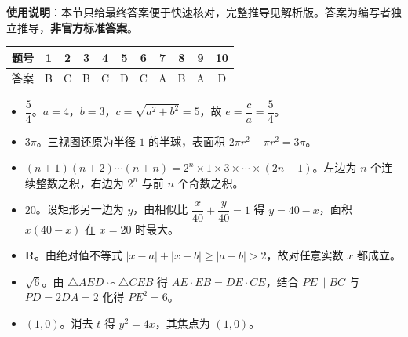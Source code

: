 
\begin{gknotice}
\textbf{使用说明}：本节只给最终答案便于快速核对，完整推导见解析版。答案为编写者独立推导，\textbf{非官方标准答案}。
\end{gknotice}

\begin{center}\begin{tabular}{ccccccccccc}
\toprule
题号 & 1 & 2 & 3 & 4 & 5 & 6 & 7 & 8 & 9 & 10 \\
\midrule
答案 & B & C & B & C & D & C & A & B & A & D \\
\bottomrule
\end{tabular}\end{center}

\begin{itemize}[leftmargin=2.6em]
  \item[\textbf{11.}] $\dfrac54$。$a=4$，$b=3$，$c=\sqrt{a^2+b^2}=5$，故 $e=\dfrac ca=\dfrac54$。
  \item[\textbf{12.}] $3\pi$。三视图还原为半径 $1$ 的半球，表面积 $2\pi r^2+\pi r^2=3\pi$。
  \item[\textbf{13.}] $(n+1)(n+2)\cdots(n+n)=2^n\times1\times3\times\cdots\times(2n-1)$。左边为 $n$ 个连续整数之积，右边为 $2^n$ 与前 $n$ 个奇数之积。
  \item[\textbf{14.}] $20$。设矩形另一边为 $y$，由相似比 $\dfrac{x}{40}+\dfrac{y}{40}=1$ 得 $y=40-x$，面积 $x(40-x)$ 在 $x=20$ 时最大。
  \item[\textbf{15.}] $\mathbf R$。由绝对值不等式 $|x-a|+|x-b|\geqslant|a-b|>2$，故对任意实数 $x$ 都成立。
  \item[\textbf{16.}] $\sqrt6$。由 $\triangle AED\backsim\triangle CEB$ 得 $AE\cdot EB=DE\cdot CE$，结合 $PE\parallel BC$ 与 $PD=2DA=2$ 化得 $PE^2=6$。
  \item[\textbf{17.}] $(1,0)$。消去 $t$ 得 $y^2=4x$，其焦点为 $(1,0)$。
\end{itemize}

